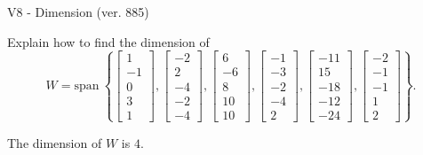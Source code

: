 \begin{exercise}
  \begin{exerciseTitle}V8 - Dimension (ver. 885)\end{exerciseTitle}
  \begin{exerciseStatement}
    Explain how to find the dimension of 
\[W=\mathrm{span}\ \left\{\left[\begin{array}{r}
1 \\
-1 \\
0 \\
3 \\
1
\end{array}\right] , \left[\begin{array}{r}
-2 \\
2 \\
-4 \\
-2 \\
-4
\end{array}\right] , \left[\begin{array}{r}
6 \\
-6 \\
8 \\
10 \\
10
\end{array}\right] , \left[\begin{array}{r}
-1 \\
-3 \\
-2 \\
-4 \\
2
\end{array}\right] , \left[\begin{array}{r}
-11 \\
15 \\
-18 \\
-12 \\
-24
\end{array}\right] , \left[\begin{array}{r}
-2 \\
-1 \\
-1 \\
1 \\
2
\end{array}\right]\right\}.\]



  \end{exerciseStatement}
  \begin{exerciseAnswer}
   The dimension of \(W\) is  \(4\).
  


  \end{exerciseAnswer}
\end{exercise}